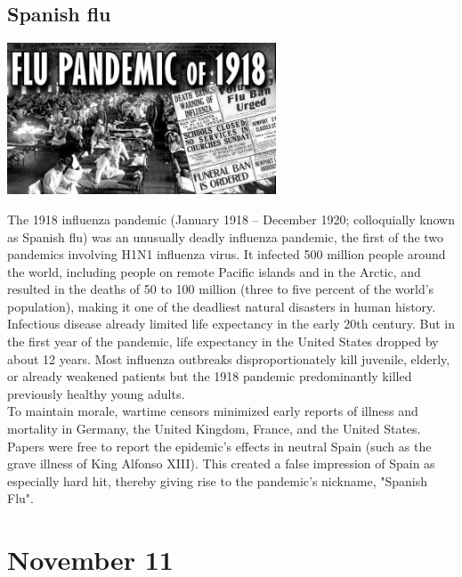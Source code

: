 \documentclass[11pt]{report}
\begin{document}
\subsection{Spanish flu}
\vspace{2mm}\begin{center}\includegraphics[width=8cm]{./img/spanishFlu.jpg}\end{center}
The 1918 influenza pandemic (January 1918 – December 1920; colloquially known as Spanish flu) was an unusually deadly influenza pandemic, the first of the two pandemics involving H1N1 influenza virus. It infected 500 million people around the world, including people on remote Pacific islands and in the Arctic, and resulted in the deaths of 50 to 100 million (three to five percent of the world's population), making it one of the deadliest natural disasters in human history.\\
Infectious disease already limited life expectancy in the early 20th century. But in the first year of the pandemic, life expectancy in the United States dropped by about 12 years. Most influenza outbreaks disproportionately kill juvenile, elderly, or already weakened patients but the 1918 pandemic predominantly killed previously healthy young adults.\\
To maintain morale, wartime censors minimized early reports of illness and mortality in Germany, the United Kingdom, France, and the United States. Papers were free to report the epidemic's effects in neutral Spain (such as the grave illness of King Alfonso XIII). This created a false impression of Spain as especially hard hit, thereby giving rise to the pandemic's nickname, "Spanish Flu".
\section{November 11}
\end{document}
